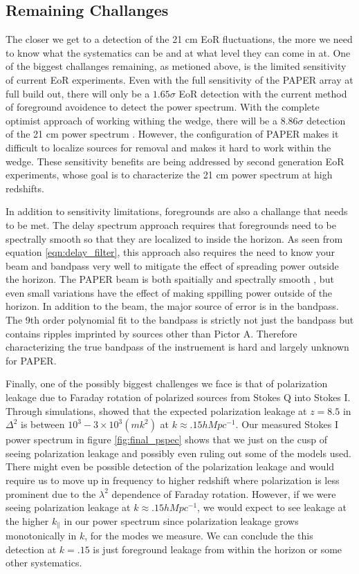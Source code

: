 \documentclass[twocolumn,numberedappendix]{emulateapj} \shorttitle{PSA64}
\begin{document}
\subsection{Remaining Challanges}
The closer we get to a detection of the 21 cm EoR fluctuations, the more we need
to know what the systematics can be and at what level they can come in at. One
of the biggest challanges remaining, as metioned above, is the limited
sensitivity of current EoR experiments. Even with the full sensitivity of the
PAPER array at full build out, there will only be a $1.65\sigma$ EoR detection
with the current method of foreground avoidence to detect the power spectrum.
With the complete optimist approach of working withing the wedge, there will be
a $8.86\sigma$ detection of the 21 cm power spectrum \citep{pober_et_al2014}.
However, the configuration of PAPER makes it difficult to localize sources for
removal and makes it hard to work within the wedge. These sensitivity benefits
are being addressed by second generation EoR experiments, whose goal is to
characterize the 21 cm power spectrum at high redshifts.

In addition to sensitivity limitations, foregrounds are also a challange that
needs to be met. The delay spectrum approach requires that foregrounds need to
be spectrally smooth so that they are localized to inside the horizon. As seen
from equation \ref{eqn:delay_filter}, this approach also requires the need to
know your beam and bandpass very well to mitigate the effect of spreading power
outside the horizon. The PAPER beam is both spaitially and spectrally smooth
\cite{pober_et_al2012}, but even small variations have the effect of
making sppilling power outside of the horizon. In addition to the beam, the
major source of error is in the bandpass. The 9th order polynomial fit to the
bandpass is strictly not just the bandpass but contains ripples imprinted by
sources other than Pictor A. Therefore characterizing the true bandpass of the
instruement is hard and largely unknown for PAPER.

Finally, one of the possibly biggest challenges we face is that of polarization
leakage due to Faraday rotation of polarized sources from Stokes Q into Stokes
I. Through simulations, \cite{moore_et_al2013} showed that the expected
polarization leakage at $z=8.5$ in $\Delta^{2}$ is between
$10^{3}-3\times10^{3} (mk^{2})$ at $k\approx{.15}hMpc^{-1}$. Our measured Stokes
I power spectrum in figure \ref{fig:final_pspec} shows that we just on the cusp
of seeing polarization leakage and possibly even ruling out some of the models
used. There might even be possible detection of the polarization leakage and
would require us to move up in frequency to higher redshift where polarization
is less prominent due to the $\lambda^{2}$ dependence of Faraday rotation.
However, if we were seeing polarization leakage at $k\approx{.15}hMpc^{-1}$, we
would expect to see leakage at the higher $k_{\parallel}$ in our power spectrum
since polarization leakage grows monotonically in $k$, for the modes we measure.
We can conclude the this detection at $k=.15$ is just foreground leakage from
within the horizon or some other systematics.
\end{document}

